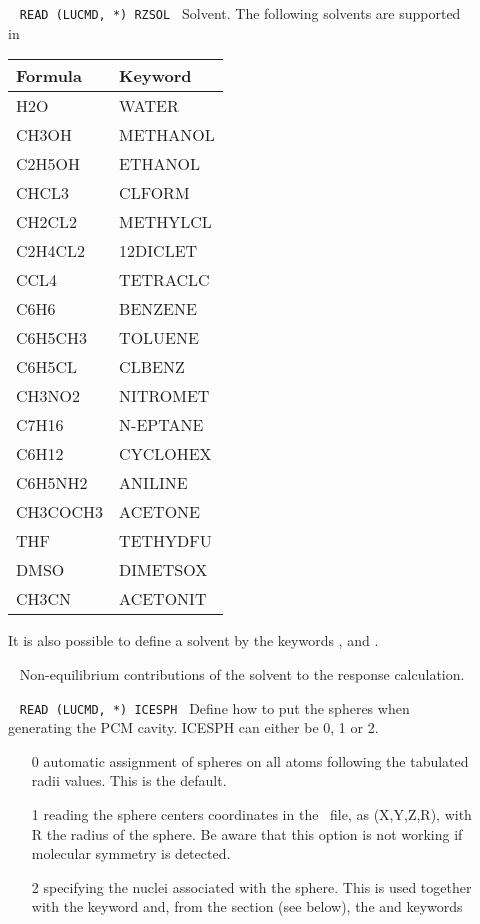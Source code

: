 \begin{description}

\item[]\verb| |\newline
\verb|READ (LUCMD, *) RZSOL|\verb| |\newline
Solvent. The following solvents are supported in
{\dalton}

\begin{tabular}[h]{l|l}
Formula  & Keyword \\
\hline
H2O      & WATER \\
CH3OH    & METHANOL \\
C2H5OH   & ETHANOL \\
CHCL3    & CLFORM \\
CH2CL2   & METHYLCL \\
C2H4CL2  & 12DICLET \\
CCL4     & TETRACLC \\
C6H6     & BENZENE \\
C6H5CH3  & TOLUENE \\
C6H5CL   & CLBENZ \\
CH3NO2   & NITROMET \\
C7H16    & N-EPTANE \\
C6H12    & CYCLOHEX \\
C6H5NH2  & ANILINE \\
CH3COCH3 & ACETONE \\
THF      & TETHYDFU \\
DMSO     & DIMETSOX \\
CH3CN    & ACETONIT \\
\hline
\end{tabular}\newline

It is also possible to define a solvent by the keywords ,
 and .

\item[]\verb| |\newline
Non-equilibrium contributions of the solvent to the response
calculation.


\item[]\verb| |\newline
\verb|READ (LUCMD, *) ICESPH|\verb| |\newline
Define how to put the spheres when generating the PCM cavity. ICESPH
can either be 0, 1 or 2.
\begin{itemize}
\item[0] automatic assignment of spheres on all atoms following the
  tabulated radii values. This is the default.
\item[1] reading the sphere centers coordinates in the \molinp\ file,
  as (X,Y,Z,R), with R the radius of the sphere. Be aware that this
  option is not working if molecular symmetry is detected.
\item[2] specifying the nuclei associated with the sphere. This is
  used together with the  keyword and, from the
   section (see below), the  and 
  keywords
\end{itemize}


\end{description}
